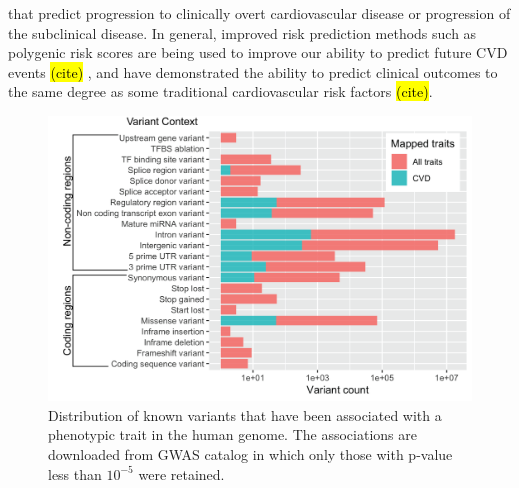 \documentclass[letter]{bioinfo}
\begin{document}
that predict progression to clinically overt cardiovascular disease or progression of the subclinical disease.  In general, improved risk prediction methods such as polygenic risk scores are being used to improve our ability to predict future CVD events \hl{(cite)} , and have demonstrated the ability to predict clinical outcomes to the same degree as some traditional cardiovascular risk factors \hl{(cite)}. 
	
		\begin{figure}[!tpb]
		\includegraphics[width=1\linewidth]{variant_contexts}
		\caption{Distribution of known variants that have been associated with a phenotypic trait in the human genome. The associations are downloaded from GWAS catalog \citep{MacArthur:2017:new} in which only those with p-value less than $10^{-5}$ were retained.}
		\label{fig:variant_context}
	\end{figure}
	
\end{document}
